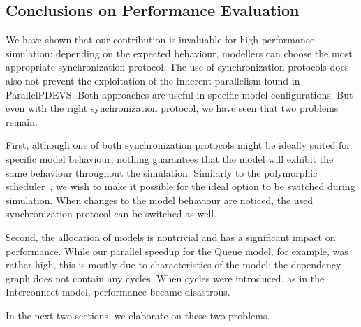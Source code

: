 \subsection{Conclusions on Performance Evaluation}
We have shown that our contribution is invaluable for high performance simulation: depending on the expected behaviour, modellers can choose the most appropriate synchronization protocol.
The use of synchronization protocols does also not prevent the exploitation of the inherent parallelism found in \textsf{ParallelPDEVS}.
Both approaches are useful in specific model configurations.
But even with the right synchronization protocol, we have seen that two problems remain.

First, although one of both synchronization protocols might be ideally suited for specific model behaviour, nothing guarantees that the model will exhibit the same behaviour throughout the simulation.
Similarly to the polymorphic scheduler~\cite{MasterThesis}, we wish to make it possible for the ideal option to be switched during simulation.
When changes to the model behaviour are noticed, the used synchronization protocol can be switched as well. 

Second, the allocation of models is nontrivial and has a significant impact on performance.
While our parallel speedup for the Queue model, for example, was rather high, this is mostly due to characteristics of the model: the dependency graph does not contain any cycles.
When cycles were introduced, as in the Interconnect model, performance became disastrous.

In the next two sections, we elaborate on these two problems.
